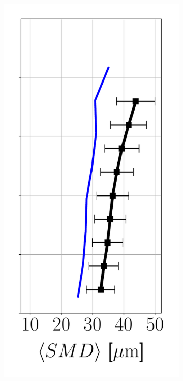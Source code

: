 \begin{figure}[ht]
\begin{subfigure}[b]{0.2\textwidth}
   \includegraphics[scale=0.35]{./part2_developments/figures_ch6_lagrangian_JICF/params_OP/profiles/SMD_along_z}
\end{subfigure}
\hspace*{0.1in}

\end{figure}
